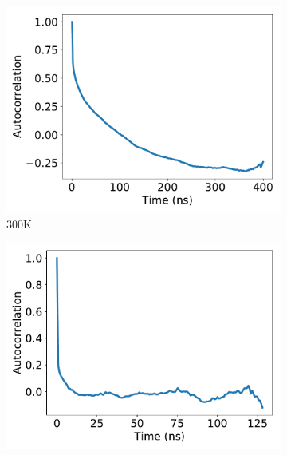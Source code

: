 \documentclass[journal=jpcbfk,manuscript=article]{achemso}
\begin{document}

  \begin{figure}[!htb]
  \centering
  \begin{subfigure}{0.45\textwidth}
  	\centering
  	\includegraphics[width=\textwidth]{dihedral_autocorrelation_300K.pdf}
  	\caption{300K}\label{fig:dihedrals_300K}
  \end{subfigure}
  \begin{subfigure}{0.45\textwidth}
  	\centering
  	\includegraphics[width=\textwidth]{dihedral_autocorrelation_500K.pdf} %

\end{subfigure}
\end{figure}
\end{document}
